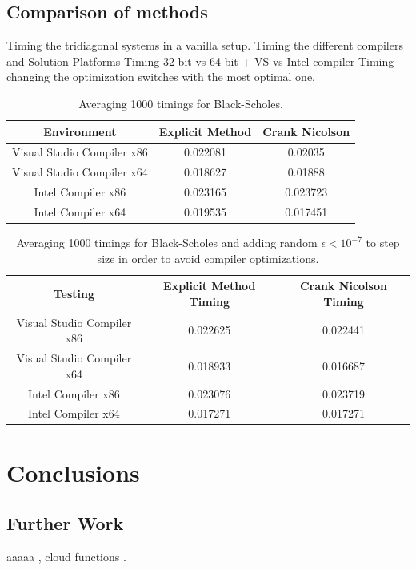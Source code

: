 \documentclass[12pt, oneside]{book}
\theoremstyle{plain}
\theoremstyle{definition}
\begin{document}
\section{Comparison of methods}
Timing  the tridiagonal systems in a vanilla setup.
Timing  the different compilers and Solution Platforms Timing 32 bit vs 64 bit + VS vs Intel compiler
Timing changing the optimization switches with the most optimal one.

\begin{table}[h!]
\centering
 \begin{tabular}{||c c c||} 
 \hline
 Environment & Explicit Method & Crank Nicolson\\ [0.5ex] 
 \hline\hline\hline
 Visual Studio Compiler x86 & 0.022081 & 0.02035\\ 
 Visual Studio Compiler x64 & 0.018627 & 0.01888\\
 Intel Compiler x86 & 0.023165 & 0.023723\\
 Intel Compiler x64 & 0.019535 & 0.017451\\ [1ex] 
 \hline
 \end{tabular}
 \caption{Averaging 1000 timings for Black-Scholes.}
\end{table}

\begin{table}[htp!]
\centering
 \begin{tabular}{||c c c||} 
 \hline
 Testing & Explicit Method Timing & Crank Nicolson Timing\\ [0.5ex] 
 \hline\hline\hline
 Visual Studio Compiler x86 & 0.022625 & 0.022441\\ 
 Visual Studio Compiler x64 & 0.018933 & 0.016687
\\
 Intel Compiler x86 & 0.023076 & 0.023719\\
 Intel Compiler x64 & 0.017271 & 0.017271\\[1ex] 
 \hline
 \end{tabular}
 \caption{Averaging 1000 timings for Black-Scholes and adding random $\epsilon < 10^{-7} $ to step size in order to avoid compiler optimizations.}
\end{table}
 
\chapter{Conclusions}

\section{Further Work}
aaaaa \cite{fpga},  cloud functions \cite{cloudfunc}.
\end{document}
